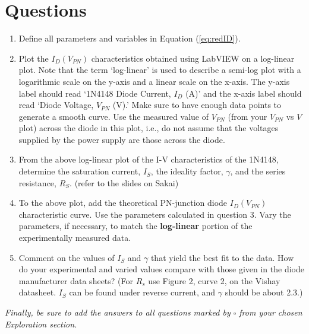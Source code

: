 \documentclass[12pt]{../manual}
\begin{document}
\newpage
\section{Questions}
\begin{enumerate}
\item Define all parameters and variables in Equation (\ref{eq:redID}).
\item Plot the $I_D(V_{PN})$ characteristics obtained using LabVIEW on a log-linear plot. Note that the term `log-linear' is used to describe a semi-log plot with a logarithmic scale on the y-axis and a linear scale on the x-axis. The y-axis label should read `1N4148 Diode Current, $I_D$ (A)' and the x-axis label should read `Diode Voltage, $V_{PN}$ (V).' Make sure to have enough data points to generate a smooth curve. Use the measured value of $V_{PN}$ (from your $V_{PN}$ vs $V$ plot) across the diode in this plot, i.e., do not assume that the voltages supplied by the power supply are those across the diode.
\item From the above log-linear plot of the I-V characteristics of the 1N4148, determine the saturation current, $I_S$, the ideality factor, $\gamma$, and the series resistance, $R_S$. (refer to the slides on Sakai)
\item To the above plot, add the theoretical PN-junction diode $I_D(V_{PN})$ characteristic curve. Use the parameters calculated in question 3. Vary the parameters, if necessary, to match the \textbf{log-linear} portion of the experimentally measured data.
\item Comment on the values of $I_S$ and $\gamma$ that yield the best fit to the data. How do your experimental and varied values compare with those given in the diode manufacturer data sheets? (For $R_s$ use Figure 2, curve 2, on the Vishay datasheet. $I_S$ can be found under reverse current, and $\gamma$ should be about 2.3.)
\end{enumerate}
\textit{Finally, be sure to add the answers to all questions marked by $\square$ from your chosen Exploration section.}

\newpage
\end{document}
